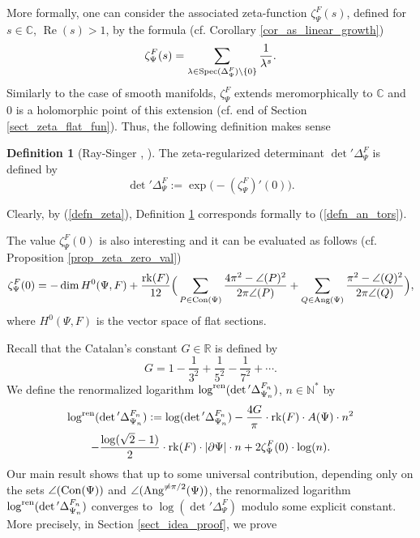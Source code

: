 \documentclass[12pt]{article}
\numberwithin{equation}{section}
\theoremstyle{theorem}
\theoremstyle{definition}
\newtheorem{defn}[thm]{Definition}
\theoremstyle{remark}
\newcommand{\comp}{\mathbb{C}}
\newcommand{\real}{\mathbb{R}}
\newcommand{\nat}{\mathbb{N}}
\newcommand{\spec}{{\rm{Spec}}}
\newcommand{\laplcomp}{\Delta}
\newcommand{\rk}[1]{{\rm{rk}} ( #1 )}
\renewcommand{\Re}{\operatorname{Re}}
\begin{document}
	\par More formally, one can consider the associated zeta-function $\zeta_{\Psi}^{F}(s)$, defined for $s \in \comp$, $\Re(s) > 1$, by the formula (cf. Corollary \ref{cor_as_linear_growth})
	\begin{equation}\label{defn_zeta}
		\zeta_{\Psi}^{F}(s) = \sum_{\lambda \in \spec(\laplcomp_{\Psi}^{F}) \setminus \{0\}} \frac{1}{\lambda^s}.
	\end{equation}
	Similarly to the case of smooth manifolds, $\zeta_{\Psi}^{F}$ extends meromorphically to $\comp$ and $0$ is a holomorphic point of this extension (cf. end of Section \ref{sect_zeta_flat_fun}). Thus, the following definition makes sense
	\begin{defn}[{Ray-Singer \cite{RSReal}, \cite{Ray73}}]\label{defn_an_tors_zeta}
	The zeta-regularized determinant $\det{}' \laplcomp_{\Psi}^{F}$ is defined by
		\begin{equation}
			\det{}' \laplcomp_{\Psi}^{F} := \exp \big(- (\zeta_{\Psi}^{F})'(0) \big).
		\end{equation}
	\end{defn}
	\begin{sloppypar}	
	Clearly, by (\ref{defn_zeta}), Definition \ref{defn_an_tors_zeta} corresponds formally to (\ref{defn_an_tors}).
	\par 
	The value $\zeta_{\Psi}^{F}(0)$ is also interesting and it can be evaluated as follows (cf. Proposition \ref{prop_zeta_zero_val})
	\begin{equation}\label{eq_value_zeta_0}
	 	\zeta_{\Psi}^{F}(0) = -\dim H^0(\Psi, F) + \frac{\rk{F}}{12}
		\Big(	 	
	 	 \sum_{P \in {\rm{Con}}(\Psi)} \frac{4 \pi^2 - \angle(P)^2}{2 \pi \angle(P)}
		+
	 	\sum_{Q \in {\rm{Ang}}(\Psi)} \frac{\pi^2 - \angle(Q)^2}{2 \pi \angle(Q)}
	 	\Big),
	\end{equation}
	where $H^0(\Psi, F)$ is the vector space of flat sections.
	\par 
	Recall that the Catalan's constant $G \in \real$ is defined by
	\begin{equation}\label{eq_defn_cat}
		G = 1 - \frac{1}{3^2} + \frac{1}{5^2} - \frac{1}{7^2} + \cdots.
	\end{equation}
	We define the renormalized logarithm $\log^{{\rm{ren}}} (\det{}'\laplcomp_{\Psi_n}^{F_n})$, $n \in \nat^*$ by
	\begin{multline}\label{eq_ren_number_sp_tree}
		\log^{{\rm{ren}}} (\det{}'\laplcomp_{\Psi_n}^{F_n})
		:=
		\log (\det{}'\laplcomp_{\Psi_n}^{F_n})  - \frac{4 G}{\pi} \cdot \rk{F} \cdot A(\Psi) \cdot n^2 
		\\
		- \frac{\log(\sqrt{2} - 1)}{2} \cdot \rk{F} \cdot |\partial \Psi| \cdot n 
		+ 2 \zeta_{\Psi}^{F}(0) \cdot \log (n).
	\end{multline}
	Our main result shows that up to some universal contribution, depending only on the sets $\angle({\rm{Con}}(\Psi))$ and $\angle({\rm{Ang}}^{\neq \pi/2}(\Psi))$, the renormalized logarithm $\log^{{\rm{ren}}} (\det{}'\laplcomp_{\Psi_n}^{F_n})$ converges to $\log( \det{}' \laplcomp_{\Psi}^{F})$ modulo some explicit constant.
	More precisely, in Section \ref{sect_idea_proof}, we prove
	\end{sloppypar}
\end{document}
